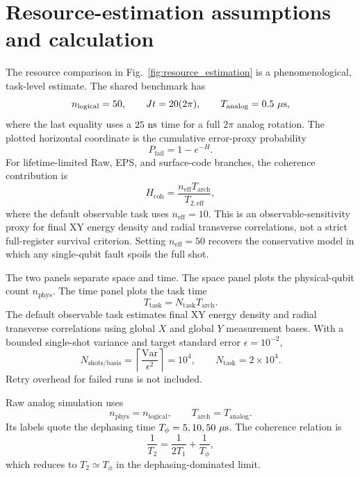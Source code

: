\documentclass[%
10pt,tightenlines,
superscriptaddress,
 amsmath,amssymb,
 aps,
pra,
]{revtex4-2}
\begin{document}
\section{Resource-estimation assumptions and calculation}\label{sm:resource_estimation}
The resource comparison in Fig.~\ref{fig:resource_estimation} is a phenomenological, task-level estimate. The shared benchmark has
\begin{equation}
    n_{\mathrm{logical}}=50,\qquad
    Jt=20(2\pi),\qquad
    T_{\mathrm{analog}}=0.5~\mu{\rm s},
\end{equation}
where the last equality uses a $25~{\rm ns}$ time for a full $2\pi$ analog rotation. The plotted horizontal coordinate is the cumulative error-proxy probability
\begin{equation}
    P_{\mathrm{fail}}=1-e^{-H}.
\end{equation}
For lifetime-limited Raw, EPS, and surface-code branches, the coherence contribution is
\begin{equation}
    H_{\mathrm{coh}}
    =\frac{n_{\mathrm{eff}}T_{\mathrm{arch}}}{T_{2,\mathrm{eff}}},
\end{equation}
where the default observable task uses $n_{\mathrm{eff}}=10$. This is an observable-sensitivity proxy for final XY energy density and radial transverse correlations, not a strict full-register survival criterion. Setting $n_{\mathrm{eff}}=50$ recovers the conservative model in which any single-qubit fault spoils the full shot.

The two panels separate space and time. The space panel plots the physical-qubit count $n_{\mathrm{phys}}$. The time panel plots the task time
\begin{equation}
    T_{\mathrm{task}}=N_{\mathrm{task}}T_{\mathrm{arch}}.
\end{equation}
The default observable task estimates final XY energy density and radial transverse correlations using global $X$ and global $Y$ measurement bases. With a bounded single-shot variance and target standard error $\epsilon=10^{-2}$,
\begin{equation}
    N_{\mathrm{shots/basis}}
    =\left\lceil \frac{\mathrm{Var}}{\epsilon^2}\right\rceil
    =10^4,\qquad
    N_{\mathrm{task}}=2\times 10^4 .
\end{equation}
Retry overhead for failed runs is not included.

Raw analog simulation uses
\begin{equation}
    n_{\mathrm{phys}}=n_{\mathrm{logical}},\qquad
    T_{\mathrm{arch}}=T_{\mathrm{analog}}.
\end{equation}
Its labels quote the dephasing time $T_\phi=5,10,50~\mu{\rm s}$. The coherence relation is
\begin{equation}
    \frac{1}{T_2}=\frac{1}{2T_1}+\frac{1}{T_\phi},
\end{equation}
which reduces to $T_2\simeq T_\phi$ in the dephasing-dominated limit.
\end{document}
